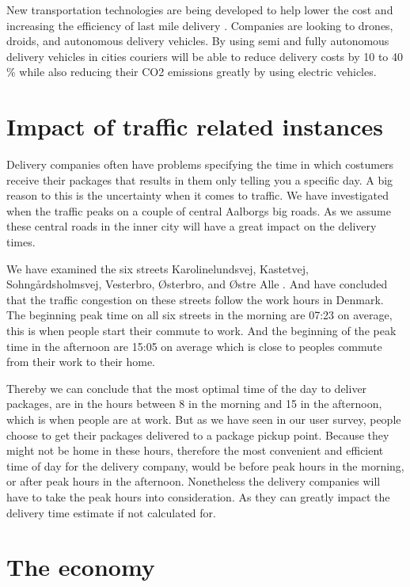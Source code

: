\documentclass[12pt]{report}
\begin{document}
New transportation technologies are being developed to help lower the cost and increasing the efficiency of last mile delivery \cite{FastForwardingLast-mileDelivery}. Companies are looking to drones, droids, and autonomous delivery vehicles. By using semi and fully autonomous delivery vehicles in cities couriers will be able to reduce delivery costs by 10 to 40 \% while also reducing their CO2 emissions greatly by using electric vehicles. \\

\section{Impact of traffic related instances}

Delivery companies often have problems specifying the time in which costumers receive their packages that results in them only telling you a specific day. A big reason to this is the uncertainty when it comes to traffic. We have investigated when the traffic peaks on a couple of central Aalborgs big roads. As we assume these central roads in the inner city will have a great impact on the delivery times. 

We have examined the six streets Karolinelundsvej, Kastetvej, Sohngårdsholmsvej, Vesterbro, Østerbro, and Østre Alle \cite{traficcount}. And have concluded that the traffic congestion on these streets follow the work hours in Denmark. The beginning peak time on all six streets in the morning are 07:23 on average, this is when people start their commute to work. And the beginning of the peak time in the afternoon are 15:05 on average which is close to peoples commute from their work to their home. 

Thereby we can conclude that the most optimal time of the day to deliver packages, are in the hours between 8 in the morning and 15 in the afternoon, which is when people are at work. But as we have seen in our user survey, people choose to get their packages delivered to a package pickup point. Because they might not be home in these hours, therefore the most convenient and efficient time of day for the delivery company, would be before peak hours in the morning, or after peak hours in the afternoon. Nonetheless the delivery companies will have to take the peak hours into consideration. As they can greatly impact the delivery time estimate if not calculated for. 



\section{The economy}
\end{document}
